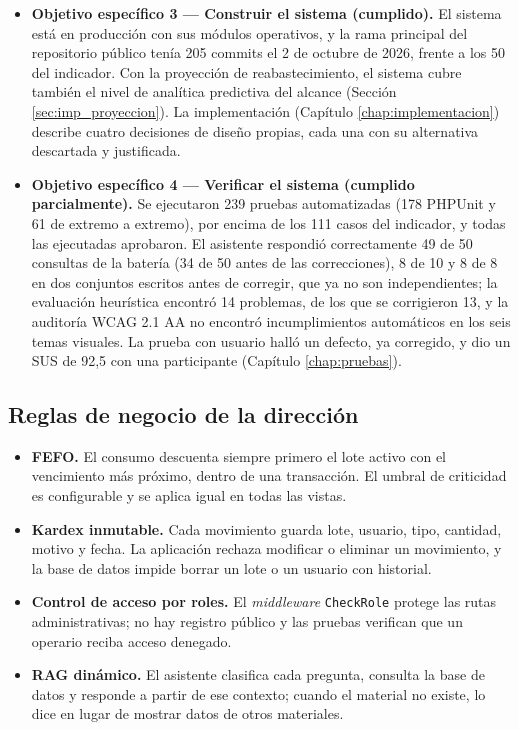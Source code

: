 \begin{itemize}
    \item \textbf{Objetivo específico 3 --- Construir el sistema (cumplido).} El sistema está en producción con sus módulos operativos, y la rama principal del repositorio público tenía 205 commits el 2 de octubre de 2026, frente a los 50 del indicador. Con la proyección de reabastecimiento, el sistema cubre también el nivel de analítica predictiva del alcance (Sección \ref{sec:imp_proyeccion}). La implementación (Capítulo \ref{chap:implementacion}) describe cuatro decisiones de diseño propias, cada una con su alternativa descartada y justificada.

    \item \textbf{Objetivo específico 4 --- Verificar el sistema (cumplido parcialmente).} Se ejecutaron 239 pruebas automatizadas (178 PHPUnit y 61 de extremo a extremo), por encima de los 111 casos del indicador, y todas las ejecutadas aprobaron. El asistente respondió correctamente 49 de 50 consultas de la batería (34 de 50 antes de las correcciones), 8 de 10 y 8 de 8 en dos conjuntos escritos antes de corregir, que ya no son independientes; la evaluación heurística encontró 14 problemas, de los que se corrigieron 13, y la auditoría WCAG 2.1 AA no encontró incumplimientos automáticos en los seis temas visuales. La prueba con usuario halló un defecto, ya corregido, y dio un SUS de 92,5 con una participante (Capítulo \ref{chap:pruebas}).
\end{itemize}

\subsection{Reglas de negocio de la dirección}

\begin{itemize}
    \item \textbf{FEFO.} El consumo descuenta siempre primero el lote activo con el vencimiento más próximo, dentro de una transacción. El umbral de criticidad es configurable y se aplica igual en todas las vistas.
    \item \textbf{Kardex inmutable.} Cada movimiento guarda lote, usuario, tipo, cantidad, motivo y fecha. La aplicación rechaza modificar o eliminar un movimiento, y la base de datos impide borrar un lote o un usuario con historial.
    \item \textbf{Control de acceso por roles.} El \textit{middleware} \texttt{CheckRole} protege las rutas administrativas; no hay registro público y las pruebas verifican que un operario reciba acceso denegado.
    \item \textbf{RAG dinámico.} El asistente clasifica cada pregunta, consulta la base de datos y responde a partir de ese contexto; cuando el material no existe, lo dice en lugar de mostrar datos de otros materiales.
\end{itemize}

